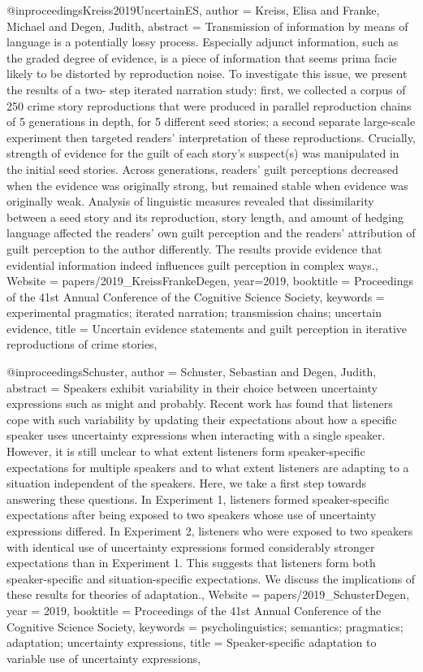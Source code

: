 {@inproceedings{Kreiss2019UncertainES,
author = {Kreiss, Elisa and Franke, Michael and Degen, Judith},
abstract = {Transmission of information by means of language is a potentially lossy process. Especially adjunct information, such as the graded degree of evidence, is a piece of information that seems prima facie likely to be distorted by reproduction noise. To investigate this issue, we present the results of a two- step iterated narration study: first, we collected a corpus of 250 crime story reproductions that were produced in parallel reproduction chains of 5 generations in depth, for 5 different seed stories; a second separate large-scale experiment then targeted readers’ interpretation of these reproductions. Crucially, strength of evidence for the guilt of each story’s suspect(s) was manipulated in the initial seed stories. Across generations, readers’ guilt perceptions decreased when the evidence was originally strong, but remained stable when evidence was originally weak. Analysis of linguistic measures revealed that dissimilarity between a seed story and its reproduction, story length, and amount of hedging language affected the readers’ own guilt perception and the readers’ attribution of guilt perception to the author differently. The results provide evidence that evidential information indeed influences guilt perception in complex ways.},
Website = {papers/2019_KreissFrankeDegen},
year={2019},
booktitle = {Proceedings of the 41st Annual Conference of the Cognitive Science Society},
keywords = {experimental pragmatics; iterated narration; transmission chains; uncertain evidence},
title = {{Uncertain evidence statements and guilt perception in iterative reproductions of crime stories}},
}

@inproceedings{Schuster,
author = {Schuster, Sebastian and Degen, Judith},
abstract = {Speakers exhibit variability in their choice between uncertainty expressions such as might and probably. Recent work has found that listeners cope with such variability by updating their expectations about how a specific speaker uses uncertainty expressions when interacting with a single speaker. However, it is still unclear to what extent listeners form speaker-specific expectations for multiple speakers and to what extent listeners are adapting to a situation independent of the speakers. Here, we take a first step towards answering these questions. In Experiment 1, listeners formed speaker-specific expectations after being exposed to two speakers whose use of uncertainty expressions differed. In Experiment 2, listeners who were exposed to two speakers with identical use of uncertainty expressions formed considerably stronger expectations than in Experiment 1. This suggests that listeners form both speaker-specific and situation-specific expectations. We discuss the implications of these results for theories of adaptation.},
Website = {papers/2019_SchusterDegen},
year = {2019},
booktitle = {Proceedings of the 41st Annual Conference of the Cognitive Science Society},
keywords = {psycholinguistics; semantics; pragmatics; adaptation; uncertainty expressions},
title = {{Speaker-specific adaptation to variable use of uncertainty expressions}},
}

}
